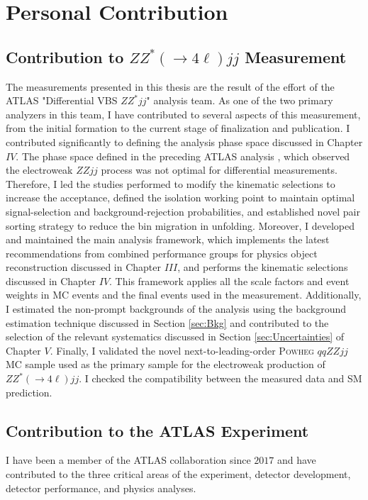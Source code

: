 \section{Personal Contribution}
\label{Appendix:Contribution}
\subsection{Contribution to $ZZ^*(\rightarrow 4\ell)jj$ Measurement} 
\label{subsec:ZZjjContr}

The measurements presented in this thesis are the result of the effort of the ATLAS "Differential VBS $ZZ^*jj$" analysis team. As one of the two primary analyzers in this team, I have contributed to several aspects of this measurement, from the initial formation to the current stage of finalization and publication. I contributed significantly to defining the analysis phase space discussed in Chapter $IV$. The phase space defined in the preceding ATLAS analysis \cite{ATLASZZjj}, which observed the electroweak $ZZjj$ process was not optimal for differential measurements. Therefore, I led the studies performed to modify the kinematic selections to increase the acceptance, defined the isolation working point to maintain optimal signal-selection and background-rejection probabilities, and established novel pair sorting strategy to reduce the bin migration in unfolding. Moreover, I developed and maintained the main analysis framework, which implements the latest recommendations from combined performance groups for physics object reconstruction discussed in Chapter $III$, and performs the kinematic selections discussed in Chapter $IV$. This framework applies all the scale factors and event weights in MC events and the final events used in the measurement. Additionally, I estimated the non-prompt backgrounds of the analysis using the background estimation technique discussed in Section \ref{sec:Bkg} and contributed to the selection of the relevant systematics discussed in Section \ref{sec:Uncertainties} of Chapter $V$. Finally, I validated the novel next-to-leading-order \textsc{Powheg} $qqZZjj$ MC sample used as the primary sample for the electroweak production of $ZZ^*(\rightarrow 4\ell)jj$. I checked the compatibility between the measured data and SM prediction. 

\subsection{Contribution to the ATLAS Experiment}
\label{subsec:ATLASContr}
I have been a member of the ATLAS collaboration since $2017$ and have contributed to the three critical areas of the experiment, detector development, detector performance, and physics analyses.

